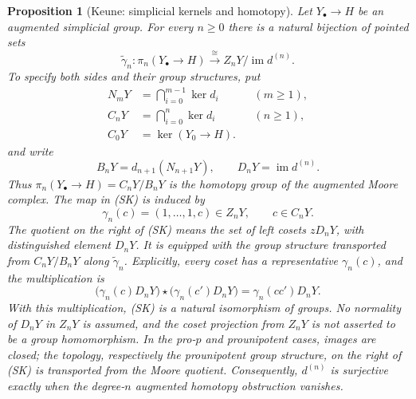 \documentclass[11pt,a4paper]{article}
\newtheorem{proposition}[theorem]{Proposition}
\theoremstyle{definition}
\begin{document}
\begin{proposition}[Keune: simplicial kernels and homotopy]
\label{prop:keune-simplicial-kernel}
Let $Y_\bullet\to H$ be an augmented simplicial group. For every
$n\geq0$ there is a natural bijection of pointed sets
\[
 \widetilde\gamma_n:
 \pi_n(Y_\bullet\to H)\xrightarrow{\ \cong\ }
 Z_nY/\operatorname{im}d^{(n)}.
 \tag{SK}
\]
To specify both sides and their group structures, put
\[
 \begin{aligned}
 N_mY&=\bigcap_{i=0}^{m-1}\ker d_i &&(m\geq1),\\
 C_nY&=\bigcap_{i=0}^{n}\ker d_i &&(n\geq1),\\
 C_0Y&=\ker(Y_0\to H).
 \end{aligned}
\]
and write
\[
 B_nY=d_{n+1}(N_{n+1}Y),\qquad
 D_nY=\operatorname{im}d^{(n)}.
\]
Thus $\pi_n(Y_\bullet\to H)=C_nY/B_nY$ is the homotopy group
of the augmented Moore complex. The map in \textup{(SK)} is induced by
\[
 \gamma_n(c)=(1,\ldots,1,c)\in Z_nY,\qquad c\in C_nY.
\]
The quotient on the right of \textup{(SK)} means the set of left cosets
$zD_nY$, with distinguished element $D_nY$. It is equipped with the
group structure transported from $C_nY/B_nY$ along
$\widetilde\gamma_n$. Explicitly, every coset has a representative
$\gamma_n(c)$, and the multiplication is
\[
 \bigl(\gamma_n(c)D_nY\bigr)\star
 \bigl(\gamma_n(c')D_nY\bigr)
 =\gamma_n(cc')D_nY.
\]
With this multiplication, \textup{(SK)} is a natural isomorphism of
groups. No normality of $D_nY$ in $Z_nY$ is assumed, and the coset
projection from $Z_nY$ is not asserted to be a group homomorphism.
In the pro-$p$ and prounipotent cases, images are closed; the topology,
respectively the prounipotent group structure, on the right of
\textup{(SK)} is transported from the Moore quotient.
Consequently, $d^{(n)}$ is surjective exactly when the degree-$n$
augmented homotopy obstruction vanishes.
\end{proposition}
\end{document}
